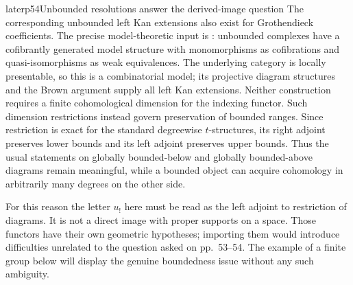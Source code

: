 \begin{dcomment}{later}{p54}{Unbounded resolutions answer the derived-image question}
The corresponding unbounded left Kan extensions also exist for Grothendieck coefficients. The precise model-theoretic input is \citet[Proposition 3.13]{Beke2000}: unbounded complexes have a cofibrantly generated model structure with monomorphisms as cofibrations and quasi-isomorphisms as weak equivalences. The underlying category is locally presentable, so this is a combinatorial model; its projective diagram structures and the Brown argument supply all left Kan extensions. Neither construction requires a finite cohomological dimension for the indexing functor. Such dimension restrictions instead govern preservation of bounded ranges. Since restriction is exact for the standard degreewise $t$-structures, its right adjoint preserves lower bounds and its left adjoint preserves upper bounds. Thus the usual statements on globally bounded-below and globally bounded-above diagrams remain meaningful, while a bounded object can acquire cohomology in arbitrarily many degrees on the other side.

For this reason the letter $u_!$ here must be read as the left adjoint to restriction of diagrams. It is not a direct image with proper supports on a space. Those functors have their own geometric hypotheses; importing them would introduce difficulties unrelated to the question asked on pp.~53--54. The example of a finite group below will display the genuine boundedness issue without any such ambiguity.
\end{dcomment}

